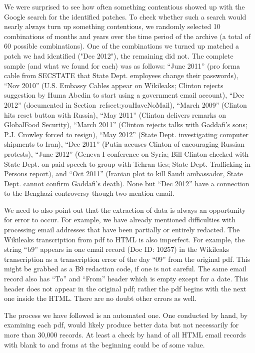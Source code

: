 \documentclass[journal]{vgtc}                %
\begin{document}
We were surprised to see how often something contentious showed up with the Google search for the identified patches.   To check whether such a search would nearly always turn up something contentious, we randomly selected 10 combinations of months and years over the time period of the archive (a total of 60 possible combinations).  One of the combinations we turned up matched a patch we had identified ("Dec 2012"), the remaining did not.  The complete sample (and what we found for each) was as follows:  ``June 2011''  (pro forma cable from SECSTATE that State Dept. employees change their passwords), ``Nov 2010''  (U.S. Embassy Cables appear on Wikileaks; Clinton rejects suggestion by Huma Abedin to start using  a government email account),   ``Dec 2012'' (documented in Section~ref{sect:youHaveNoMail}), ``March 2009'' (Clinton hits reset button with Russia), ``May 2011'' (Clinton delivers remarks on GlobalFood Security), ``March 2011'' (Clinton rejects talks with Gaddafi's sons; P.J. Crowley forced to resign), ``May 2012'' (State Dept. investigating computer shipments to Iran), ``Dec 2011'' (Putin accuses Clinton of encouraging Russian protests), ``June 2012'' (Geneva I conference on Syria; Bill Clinton checked with State Dept. on paid speech to group with Tehran ties; State Dept. Trafficking in Persons report), and  ``Oct 2011'' (Iranian plot to kill Saudi ambassador, State Dept. cannot confirm Gaddafi's death).   None but ``Dec 2012'' have a connection to the Benghazi controversy though two mention email.
 
 We need to also point out that the extraction of data is always an opportunity for error to occur.   For example, we have already mentioned difficulties with processing email addresses that have been partially or entirely redacted.  The Wikileaks transcription from pdf to HTML is also imperfect.  For example, the string ``b9''  appears in one email record (Doc ID: 10257) in the Wikileaks transcription\cite{errorWikileaks} as a transcription error of the day ``09'' from the original pdf.  This might be grabbed as a B9  redaction code, if one is not careful.  The same email record also has ``To'' and ``From'' header which is empty except for a date.  This header does not appear in the original pdf; rather the pdf begins with the next one inside the HTML.   There are no doubt other errors as well.  
 
 The process we have followed is an automated one.  One conducted by hand, by examining each pdf, would likely produce better data but not necessarily for more than 30,000 records.  At least a check by hand of all HTML email records with blank to and froms at the beginning could be of some value.
 
\end{document}
